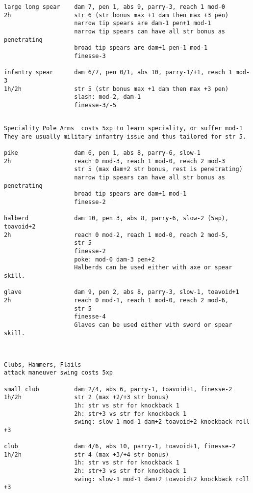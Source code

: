 \begin{verbatim}
large long spear    dam 7, pen 1, abs 9, parry-3, reach 1 mod-0
2h                  str 6 (str bonus max +1 dam then max +3 pen)
                    narrow tip spears are dam-1 pen+1 mod-1
                    narrow tip spears can have all str bonus as penetrating
                    broad tip spears are dam+1 pen-1 mod-1
                    finesse-3

infantry spear      dam 6/7, pen 0/1, abs 10, parry-1/+1, reach 1 mod-3
1h/2h               str 5 (str bonus max +1 dam then max +3 pen)
                    slash: mod-2, dam-1
                    finesse-3/-5


\end{verbatim} \goodbreak \begin{verbatim}
Speciality Pole Arms  costs 5xp to learn speciality, or suffer mod-1
They are usually military infantry issue and thus tailored for str 5.

pike                dam 6, pen 1, abs 8, parry-6, slow-1
2h                  reach 0 mod-3, reach 1 mod-0, reach 2 mod-3
                    str 5 (max dam+2 str bonus, rest is penetrating)
                    narrow tip spears can have all str bonus as penetrating
                    broad tip spears are dam+1 mod-1
                    finesse-2

halberd             dam 10, pen 3, abs 8, parry-6, slow-2 (5ap), toavoid+2
2h                  reach 0 mod-2, reach 1 mod-0, reach 2 mod-5,
                    str 5
                    finesse-2
                    poke: mod-0 dam-3 pen+2
                    Halberds can be used either with axe or spear skill.

glave               dam 9, pen 2, abs 8, parry-3, slow-1, toavoid+1
2h                  reach 0 mod-1, reach 1 mod-0, reach 2 mod-6,
                    str 5
                    finesse-4
                    Glaves can be used either with sword or spear skill.



\end{verbatim} \goodbreak \begin{verbatim}
Clubs, Hammers, Flails
attack maneuver swing costs 5xp

small club          dam 2/4, abs 6, parry-1, toavoid+1, finesse-2
1h/2h               str 2 (max +2/+3 str bonus)
                    1h: str vs str for knockback 1
                    2h: str+3 vs str for knockback 1
                    swing: slow-1 mod-1 dam+2 toavoid+2 knockback roll +3

club                dam 4/6, abs 10, parry-1, toavoid+1, finesse-2
1h/2h               str 4 (max +3/+4 str bonus)
                    1h: str vs str for knockback 1
                    2h: str+3 vs str for knockback 1
                    swing: slow-1 mod-1 dam+2 toavoid+2 knockback roll +3


\end{verbatim}
